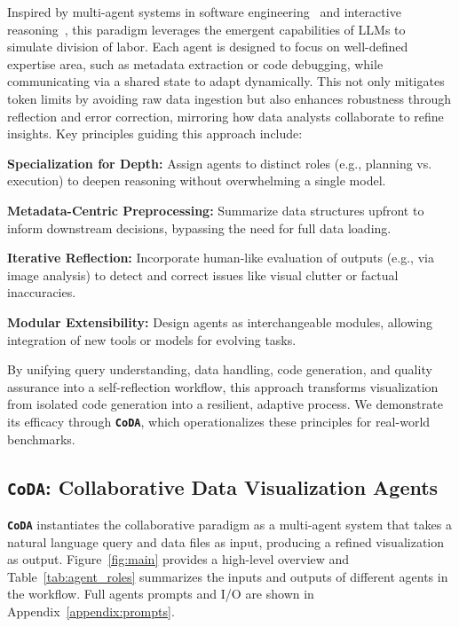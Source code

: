 \documentclass[11pt, a4paper, logo, copyright]{googlecloud}
\newcommand{\methodname}{\textbf{\texttt{\textcolor{StarIndigo}{C}\textcolor{StarIndigo}{o}\textcolor{StarCoral}{D}\textcolor{StarTeal}{A}}}}
\begin{document}
Inspired by multi-agent systems in software engineering~\citep{Yang2024SWEagentAI} and interactive reasoning~\citep{Yao2022ReActSR}, this paradigm leverages the emergent capabilities of LLMs to simulate division of labor. Each agent is designed to focus on well-defined expertise area, such as metadata extraction or code debugging, while communicating via a shared state to adapt dynamically. This not only mitigates token limits by avoiding raw data ingestion but also enhances robustness through reflection and error correction, mirroring how data analysts collaborate to refine insights.
Key principles guiding this approach include:

\textbf{\textcolor{StarIndigo}{Specialization for Depth:}} Assign agents to distinct roles (e.g., planning vs. execution) to deepen reasoning without overwhelming a single model.

\textbf{\textcolor{StarIndigo}{Metadata-Centric Preprocessing:}} Summarize data structures upfront to inform downstream decisions, bypassing the need for full data loading.

\textbf{\textcolor{StarIndigo}{Iterative Reflection:}} Incorporate human-like evaluation of outputs (e.g., via image analysis) to detect and correct issues like visual clutter or factual inaccuracies.

\textbf{\textcolor{StarIndigo}{Modular Extensibility:}} Design agents as interchangeable modules, allowing integration of new tools or models for evolving tasks.


By unifying query understanding, data handling, code generation, and quality assurance into a self-reflection workflow, this approach transforms visualization from isolated code generation into a resilient, adaptive process. We demonstrate its efficacy through \methodname{}, which operationalizes these principles for real-world benchmarks.

\subsection{\methodname{}: Collaborative Data Visualization Agents}

\methodname{} instantiates the collaborative paradigm as a multi-agent system that takes a natural language query and data files as input, producing a refined visualization as output. Figure~\ref{fig:main} provides a high-level overview and Table~\ref{tab:agent_roles} summarizes the inputs and outputs of different agents in the workflow. 
Full agents prompts and I/O are shown in Appendix~\ref{appendix:prompts}.
\end{document}
